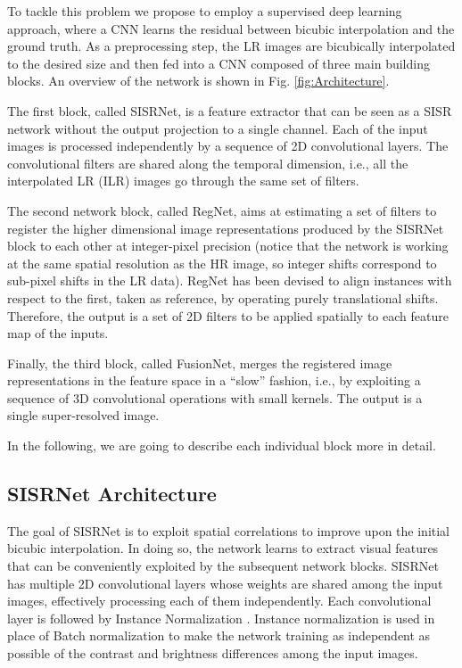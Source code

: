 \documentclass[journal]{IEEEtran}
\begin{document}
To tackle this problem we propose to employ a supervised deep learning approach, where a CNN learns the residual between bicubic interpolation and the ground truth.
As a preprocessing step, the LR images are bicubically interpolated to the desired size and then fed into a CNN composed of three main building blocks. An overview of the network is shown in Fig. \ref{fig:Architecture}.

The first block, called SISRNet, is a feature extractor that can be seen as a SISR network without the output projection to a single channel. Each of the  input images is processed independently by a sequence of 2D convolutional layers. The convolutional filters are shared along the temporal dimension, i.e., all the  interpolated LR (ILR) images go through the same set of filters.

The second network block, called RegNet, aims at estimating a set of filters to register the  higher dimensional image representations produced by the SISRNet block to each other at integer-pixel precision (notice that the network is working at the same spatial resolution as the HR image, so integer shifts correspond to sub-pixel shifts in the LR data). RegNet has been devised to align  instances with respect to the first, taken as reference, by operating purely translational shifts. Therefore, the output is a set of  2D filters to be applied spatially to each feature map of the  inputs. 

Finally, the third block, called FusionNet, merges the registered image representations in the feature space in a ``slow'' fashion, i.e., by exploiting a sequence of 3D convolutional operations with small kernels. The output is a single super-resolved image.

In the following, we are going to describe each individual block more in detail.

\subsection{SISRNet Architecture}

The goal of SISRNet is to exploit spatial correlations to improve upon the initial bicubic interpolation. In doing so, the network learns to extract visual features that can be conveniently exploited by the subsequent network blocks. SISRNet has multiple 2D convolutional layers whose weights are shared among the  input images, effectively processing each of them independently. Each convolutional layer is followed by Instance Normalization \cite{vedaldi2016instance}. Instance normalization is used in place of Batch normalization \cite{ioffe2015batch} to make the network training as independent as possible of the contrast and brightness differences among the input images.
\end{document}
